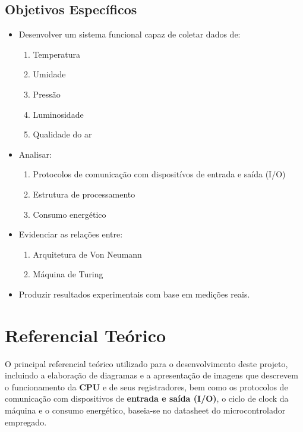 \documentclass[a4paper,12pt]{article}
\begin{document}
\subsection{Objetivos Específicos}
\begin{itemize}
    \item Desenvolver um sistema funcional capaz de coletar dados de:
    \begin{enumerate}
        \item Temperatura
        \item Umidade
        \item Pressão
        \item Luminosidade
        \item Qualidade do ar
    \end{enumerate}

    \item Analisar:
    \begin{enumerate}
        \item Protocolos de comunicação com dispositívos de entrada e saída (I/O)
        \item Estrutura de processamento
        \item Consumo energético
    \end{enumerate}

    \item Evidenciar as relações entre:
    \begin{enumerate}
        \item Arquitetura de Von Neumann
        \item Máquina de Turing
    \end{enumerate}

    \item Produzir resultados experimentais com base em medições reais.
\end{itemize}

\section{Referencial Teórico}

O principal referencial teórico utilizado para o desenvolvimento deste projeto, incluindo a elaboração de diagramas e a apresentação de imagens que descrevem o funcionamento da \textbf{CPU} e de seus registradores, bem como os protocolos de comunicação com dispositivos de \textbf{entrada e saída (I/O)}, o ciclo de clock da máquina e o consumo energético, baseia-se no datasheet do microcontrolador empregado.
\end{document}
